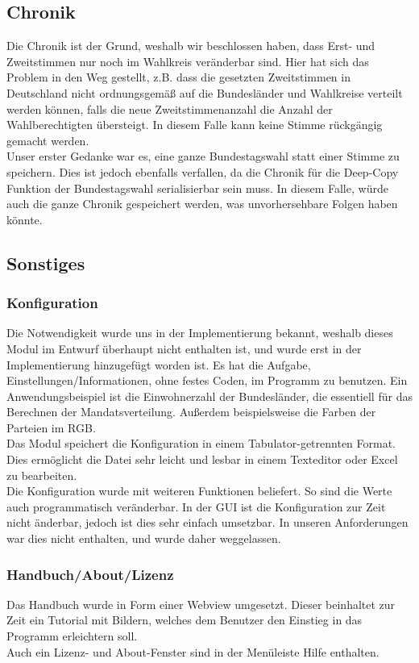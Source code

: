\documentclass[12pt,a4paper,titlepage]{article}
\begin{document}
	\subsection{Chronik}
Die Chronik ist der Grund, weshalb wir beschlossen haben, dass Erst- und Zweitstimmen nur noch im Wahlkreis veränderbar sind. Hier hat sich das Problem in den Weg gestellt, z.B. dass die gesetzten Zweitstimmen in Deutschland nicht ordnungsgemäß auf die Bundesländer und Wahlkreise verteilt werden können, falls die neue Zweitstimmenanzahl die Anzahl der Wahlberechtigten übersteigt. In diesem Falle kann keine Stimme rückgängig gemacht werden. \\
Unser erster Gedanke war es, eine ganze Bundestagswahl statt einer Stimme zu speichern. Dies ist jedoch ebenfalls verfallen, da die Chronik für die Deep-Copy Funktion der Bundestagswahl serialisierbar sein muss. In diesem Falle, würde auch die ganze Chronik gespeichert werden, was unvorhersehbare Folgen haben könnte. 



	\subsection{Sonstiges}
\subsubsection{Konfiguration}
Die Notwendigkeit wurde uns in der Implementierung bekannt, weshalb dieses Modul im Entwurf überhaupt nicht enthalten ist, und wurde erst in der Implementierung hinzugefügt worden ist. Es hat die Aufgabe, Einstellungen/Informationen, ohne festes Coden, im Programm zu benutzen. Ein Anwendungsbeispiel ist die Einwohnerzahl der Bundesländer, die essentiell für das Berechnen der Mandatsverteilung. Außerdem beispielsweise die Farben der Parteien im RGB. \\
Das Modul speichert die Konfiguration in einem Tabulator-getrennten Format. Dies ermöglicht die Datei sehr leicht und lesbar in einem Texteditor oder Excel zu bearbeiten. \\
Die Konfiguration wurde mit weiteren Funktionen beliefert. So sind die Werte auch programmatisch veränderbar. In der GUI ist die Konfiguration zur Zeit nicht änderbar, jedoch ist dies sehr einfach umsetzbar. In unseren Anforderungen war dies nicht enthalten, und wurde daher weggelassen.

\subsubsection{Handbuch/About/Lizenz}
Das Handbuch wurde in Form einer Webview umgesetzt. Dieser beinhaltet zur Zeit ein Tutorial mit Bildern, welches dem Benutzer den Einstieg in das Programm erleichtern soll. \\
Auch ein Lizenz- und About-Fenster sind in der Menüleiste Hilfe enthalten.\\
\end{document}
